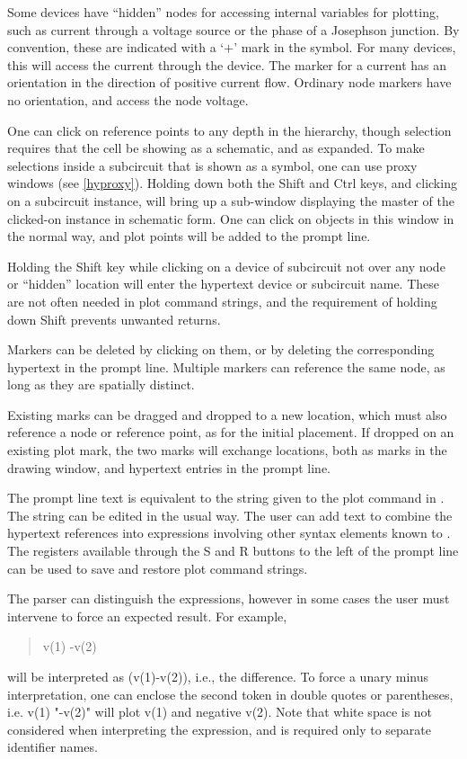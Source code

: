 Some devices have ``hidden'' nodes for accessing internal variables
for plotting, such as current through a voltage source or the phase of
a Josephson junction.  By convention, these are indicated with a `$+$'
mark in the symbol.  For many devices, this will access the current
through the device.  The marker for a current has an orientation in
the direction of positive current flow.  Ordinary node markers have no
orientation, and access the node voltage.

One can click on reference points to any depth in the hierarchy,
though selection requires that the cell be showing as a schematic, and
as expanded.  To make selections inside a subcircuit that is shown as
a symbol, one can use proxy windows (see \ref{hyproxy}).  Holding down
both the {\kb Shift} and {\kb Ctrl} keys, and clicking on a subcircuit
instance, will bring up a sub-window displaying the master of the
clicked-on instance in schematic form.  One can click on objects in
this window in the normal way, and plot points will be added to the
prompt line.

Holding the {\kb Shift} key while clicking on a device of subcircuit
not over any node or ``hidden'' location will enter the hypertext
device or subcircuit name.  These are not often needed in plot command
strings, and the requirement of holding down {\kb Shift} prevents
unwanted returns.

Markers can be deleted by clicking on them, or by deleting the
corresponding hypertext in the prompt line.  Multiple markers can
reference the same node, as long as they are spatially distinct.

Existing marks can be dragged and dropped to a new location, which
must also reference a node or reference point, as for the initial
placement.  If dropped on an existing plot mark, the two marks will
exchange locations, both as marks in the drawing window, and hypertext
entries in the prompt line.

The prompt line text is equivalent to the string given to the {\cb
plot} command in {\WRspice}.  The string can be edited in the usual
way.  The user can add text to combine the hypertext references into
expressions involving other syntax elements known to {\WRspice}.  The
registers available through the {\cb S} and {\cb R} buttons to the
left of the prompt line can be used to save and restore plot command
strings.

The {\WRspice} parser can distinguish the expressions, however in some
cases the user must intervene to force an expected result.  For
example,
\begin{quote}
\vt v(1) -v(2)
\end{quote}
will be interpreted as {\vt (v(1)-v(2))}, i.e., the difference.  To
force a unary minus interpretation, one can enclose the second token
in double quotes or parentheses, i.e. {\vt v(1) "-v(2)"} will plot
{\vt v(1)} and negative {\vt v(2)}.  Note that white space is not
considered when interpreting the expression, and is required only to
separate identifier names.

